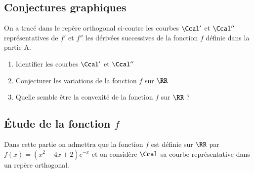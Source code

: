 \documentclass[oneside,12pt]{article}
\begin{document}
\subsection{Conjectures graphiques}
On a tracé dans le repère orthogonal ci-contre les courbes $\Ccal'$ et $\Ccal''$ représentatives de $f'$ et $f''$ les dérivées successives de la fonction $f$ définie dans la partie A.

\begin{center}
\end{center}

\begin{enumerate}
    \item Identifier les courbes $\Ccal'$ et $\Ccal''$
    \item Conjecturer les variations de la fonction $f$ sur $\RR$
    \item Quelle semble être la convexité de la fonction $f$ sur $\RR$ ?
\end{enumerate}

\subsection{Étude de la fonction $f$}
Dans cette partie on admettra que la fonction $f$ est définie sur $\RR$ par $f(x)=(x^2-4x+2)e^{-x}$ et on considère $\Ccal$ sa courbe représentative dans un repère orthogonal.
\end{document}
